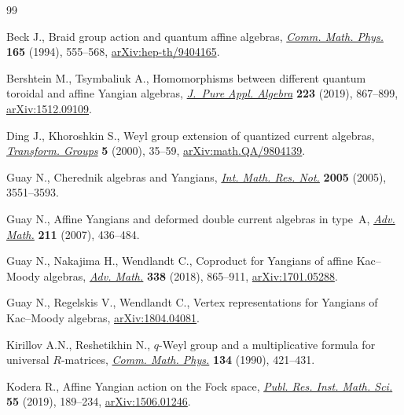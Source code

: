\documentclass[pdftex]{sigma}
\theoremstyle{definition}
\numberwithin{equation}{section}
\begin{document}
\begin{thebibliography}{99}
\footnotesize\itemsep=0pt

Beck J., Braid group action and quantum affine algebras, \href{https://doi.org/10.1007/BF02099423}{\textit{Comm. Math.
 Phys.}} \textbf{165} (1994), 555--568, \href{https://arxiv.org/abs/hep-th/9404165}{arXiv:hep-th/9404165}.

Bershtein M., Tsymbaliuk A., Homomorphisms between different quantum toroidal
 and affine {Y}angian algebras, \href{https://doi.org/10.1016/j.jpaa.2018.05.003}{\textit{J.~Pure Appl. Algebra}} \textbf{223}
 (2019), 867--899, \href{https://arxiv.org/abs/1512.09109}{arXiv:1512.09109}.

Ding J., Khoroshkin S., Weyl group extension of quantized current algebras,
 \href{https://doi.org/10.1007/BF01237177}{\textit{Transform. Groups}} \textbf{5} (2000), 35--59,
 \href{https://arxiv.org/abs/math.QA/9804139}{arXiv:math.QA/9804139}.

Guay N., Cherednik algebras and {Y}angians, \href{https://doi.org/10.1155/IMRN.2005.3551}{\textit{Int. Math. Res. Not.}}
 \textbf{2005} (2005), 3551--3593.

Guay N., Affine {Y}angians and deformed double current algebras in type~{A},
 \href{https://doi.org/10.1016/j.aim.2006.08.007}{\textit{Adv. Math.}} \textbf{211} (2007), 436--484.

Guay N., Nakajima H., Wendlandt C., Coproduct for {Y}angians of affine
 {K}ac--{M}oody algebras, \href{https://doi.org/10.1016/j.aim.2018.09.013}{\textit{Adv. Math.}} \textbf{338} (2018), 865--911,
 \href{https://arxiv.org/abs/1701.05288}{arXiv:1701.05288}.

Guay N., Regelskis V., Wendlandt C., Vertex representations for {Y}angians of
 {K}ac--{M}oody algebras, \href{https://arxiv.org/abs/1804.04081}{arXiv:1804.04081}.

Kirillov A.N., Reshetikhin N., {$q$}-{W}eyl group and a multiplicative formula
 for universal {$R$}-matrices, \href{https://doi.org/10.1007/BF02097710}{\textit{Comm. Math. Phys.}} \textbf{134} (1990),
 421--431.

Kodera R., Affine {Y}angian action on the {F}ock space, \href{https://doi.org/10.4171/PRIMS/55-1-6}{\textit{Publ. Res.
 Inst. Math. Sci.}} \textbf{55} (2019), 189--234, \href{https://arxiv.org/abs/1506.01246}{arXiv:1506.01246}.


\end{thebibliography}
\end{document}
